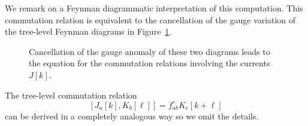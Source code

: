 \documentclass[11pt]{amsart}
\begin{document}
We remark on a Feynman diagrammatic interpretation of this computation. 
This commutation relation is equivalent to the cancellation of the gauge variation of the tree-level Feynman diagrams in Figure~\ref{fig:cancel1}.

\begin{figure}
	\caption{Cancellation of the gauge anomaly of these two diagrams leads to the equation for the commutation relations involving the currents $J[k]$.
	\label{fig:cancel1}}
\end{figure}

The tree-level commutation relation 
\begin{equation}\label{eqn:rel2}
[J_a [k] , K_b [\ell]] = f_{ab}^c K_{c} [k+\ell]
\end{equation}
can be derived in a completely analogous way so we omit the details. 
\end{document}
